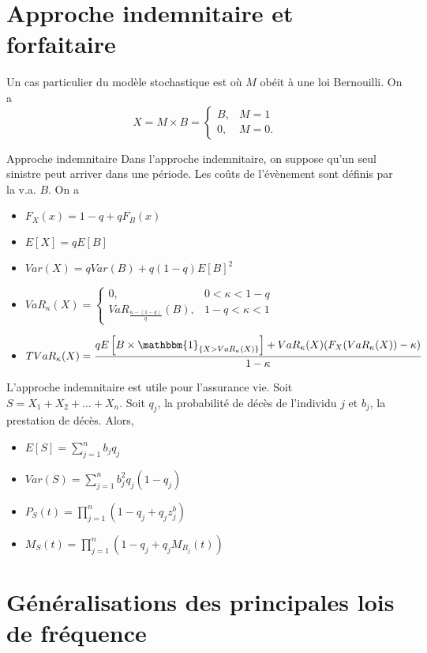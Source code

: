 \section{Approche indemnitaire et forfaitaire}

Un cas particulier du modèle stochastique est où $M$ obéit à une loi Bernouilli. On a 
$$X = M \times B = \begin{cases}
B, & M = 1\\
0, & M = 0.
\end{cases}$$

\begin{definition}{Approche indemnitaire}{}
	Dans l'approche indemnitaire, on suppose qu'un seul sinistre peut arriver dans une période. Les coûts de l'évènement sont définis par la v.a. $B$. On a 
	
	\begin{itemize}
		\item $\displaystyle F_X(x) = 1-q + qF_B(x)$
		\item $\displaystyle E[X] = qE[B]$
		\item $\displaystyle Var(X) = qVar(B) + q(1-q)E[B]^2$
		\item $\displaystyle VaR_\kappa(X) = \begin{cases}
		0, & 0<\kappa<1-q\\
		VaR_{\frac{\kappa - (1-q)}{q}}(B), & 1-q<\kappa<1
		\end{cases}$
		\item $\displaystyle TVaR_\kappa(X) = \frac{qE\left[B\times \mathbbm{1}_{\{X > VaR_\kappa(X)\}}\right] + VaR_\kappa(X)(F_X(VaR_\kappa(X)) - \kappa)}{1 - \kappa}$
	\end{itemize}
\end{definition}

L'approche indemnitaire est utile pour l'assurance vie. Soit $S = X_1 + X_2 + \dots + X_n$. Soit $q_j$, la probabilité de décès de l'individu $j$ et $b_j$, la prestation de décès. Alors, 
\begin{itemize}
	\item $\displaystyle E[S] = \sum_{j = 1}^{n}b_j q_j$
	\item $\displaystyle Var(S) = \sum_{j = 1}^{n}b_j^2 q_j(1-q_j)$
	\item $\displaystyle P_S(t) = \prod_{j = 1}^{n}(1 - q_j + q_j z ^ b_j)$
	\item $\displaystyle M_S(t) = \prod_{j = 1}^{n}(1 - q_j + q_j M_{B_j}(t))$
\end{itemize}

\section{Généralisations des principales lois de fréquence}

